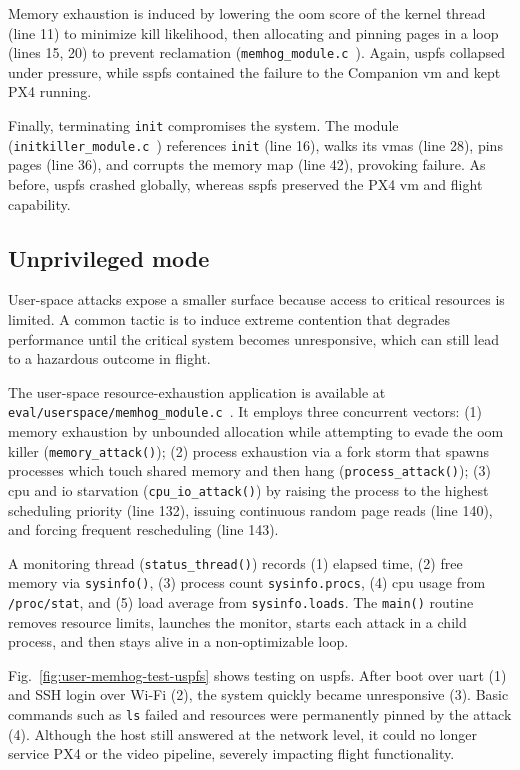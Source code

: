 Memory exhaustion is induced by lowering the \gls{oom} score of the kernel
thread (line 11) to minimize kill likelihood, then allocating and pinning pages
in a loop (lines 15, 20) to prevent reclamation
(\lstinline{memhog_module.c}~\cite{thesis-sw-github}). Again, \gls{uspfs}
collapsed under pressure, while \gls{sspfs} contained the failure to the
Companion \gls{vm} and kept PX4 running.

Finally, terminating \lstinline{init} compromises the system. The module
(\lstinline{initkiller_module.c}~\cite{thesis-sw-github}) references
\lstinline{init} (line 16), walks its \glspl{vma} (line 28), pins pages (line
36), and corrupts the memory map (line 42), provoking failure. As before,
\gls{uspfs} crashed globally, whereas \gls{sspfs} preserved the PX4 \gls{vm} and
flight capability.

\subsection{Unprivileged mode}
\label{sec:unprivileged-mode}
User-space attacks expose a smaller surface because access to critical resources
is limited. A common tactic is to induce extreme contention that degrades
performance until the critical system becomes unresponsive, which can still lead
to a hazardous outcome in flight.

The user-space resource-exhaustion application is available at
\lstinline{eval/userspace/memhog_module.c}~\cite{thesis-sw-github}. It employs three concurrent vectors:
(1) memory exhaustion by unbounded allocation while attempting to evade the \gls{oom} killer (\lstinline{memory_attack()});
(2) process exhaustion via a fork storm that spawns processes which touch shared memory and then hang (\lstinline{process_attack()});
(3) \gls{cpu} and \gls{io} starvation (\lstinline{cpu_io_attack()}) by raising the process to the highest scheduling priority (line 132), issuing continuous random page reads (line 140), and forcing frequent rescheduling (line 143).

A monitoring thread (\lstinline{status_thread()}) records (1) elapsed time, (2) free memory via \lstinline{sysinfo()}, (3) process count \lstinline{sysinfo.procs}, (4) \gls{cpu} usage from \lstinline{/proc/stat}, and (5) load average from \lstinline{sysinfo.loads}. The \lstinline{main()} routine removes resource limits, launches the monitor, starts each attack in a child process, and then stays alive in a non-optimizable loop.

Fig.~\ref{fig:user-memhog-test-uspfs} shows testing on \gls{uspfs}. After boot over \gls{uart} (1) and SSH login over Wi-Fi (2), the system quickly became unresponsive (3). Basic commands such as \lstinline{ls} failed and resources were permanently pinned by the attack (4). Although the host still answered at the network level, it could no longer service PX4 or the video pipeline, severely impacting flight functionality.

